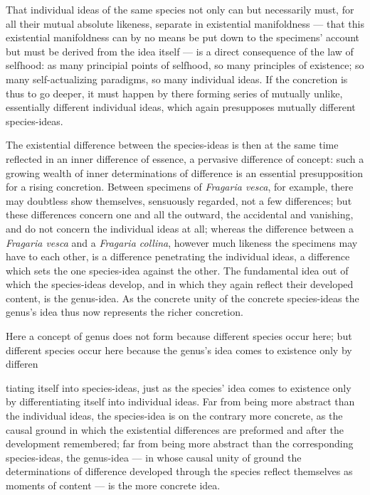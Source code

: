\documentclass[12pt,a4paper]{book}
\begin{document}
That individual ideas of the same species not only can but necessarily must, for
all their mutual absolute likeness, separate in existential manifoldness --- that
this existential manifoldness can by no means be put down to the specimens' account
but must be derived from the idea itself --- is a direct consequence of the law of
selfhood: as many principial points of selfhood, so many principles of existence;
so many self-actualizing paradigms, so many individual ideas. If the concretion is
thus to go deeper, it must happen by there forming series of mutually unlike,
essentially different individual ideas, which again presupposes mutually different
species-ideas.

The existential difference between the species-ideas is then at the same time
reflected in an inner difference of essence, a pervasive difference of concept:
such a growing wealth of inner determinations of difference is an essential
presupposition for a rising concretion. Between specimens of \textit{Fragaria
vesca}, for example, there may doubtless show themselves, sensuously regarded, not
a few differences; but these differences concern one and all the outward, the
accidental and vanishing, and do not concern the individual ideas at all; whereas
the difference between a \textit{Fragaria vesca} and a \textit{Fragaria collina},
however much likeness the specimens may have to each other, is a difference
penetrating the individual ideas, a difference which sets the one species-idea
against the other. The fundamental idea out of which the species-ideas develop, and
in which they again reflect their developed content, is the genus-idea. As the
concrete unity of the concrete species-ideas the genus's idea thus now represents
the richer concretion.

Here a concept of genus does not form because different species occur here; but
different species occur here because the genus's idea comes to existence only by
differen%

tiating itself into species-ideas, just as the species' idea comes to existence
only by differentiating itself into individual ideas. Far from being more abstract
than the individual ideas, the species-idea is on the contrary more concrete, as
the causal ground in which the existential differences are preformed and after the
development remembered; far from being more abstract than the corresponding
species-ideas, the genus-idea --- in whose causal unity of ground the determinations
of difference developed through the species reflect themselves as moments of
content --- is the more concrete idea.
\end{document}
